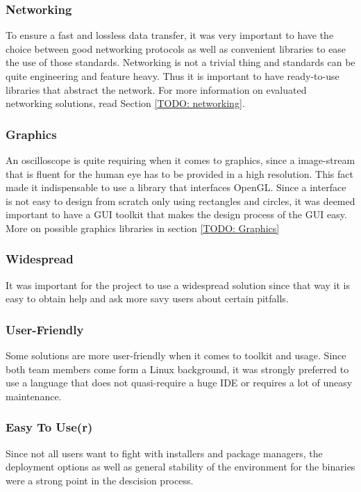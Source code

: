 \subsubsection*{Networking} To ensure a fast and lossless data transfer, it was very important to have the choice between good networking protocols as well as convenient libraries to ease the use of those standards.
Networking is not a trivial thing and standards can be quite engineering and feature heavy. Thus it is important to have ready-to-use libraries that abstract the network. For more information on evaluated networking solutions, read Section \ref{TODO: networking}.

\subsubsection*{Graphics} An oscilloscope is quite requiring when it comes to graphics, since a image-stream that is fluent for the human eye has to be provided in a high resolution. This fact made it indispensable to use a library that interfaces OpenGL. Since a interface is not easy to design from scratch only using rectangles and circles, it was deemed important to have a GUI toolkit that makes the design process of the GUI easy. More on possible graphics libraries in section \ref{TODO: Graphics}

\subsubsection*{Widespread} It was important for the project to use a widespread solution since that way it is easy to obtain help and ask more savy users about certain pitfalls.

\subsubsection*{User-Friendly} Some solutions are more user-friendly when it comes to toolkit and usage. Since both team members come form a Linux background, it was strongly preferred to use a language that does not quasi-require a huge IDE or requires a lot of uneasy maintenance.

\subsubsection*{Easy To Use(r)} Since not all users want to fight with installers and package managers, the deployment options as well as general stability of the environment for the binaries were a strong point in the descision process.

